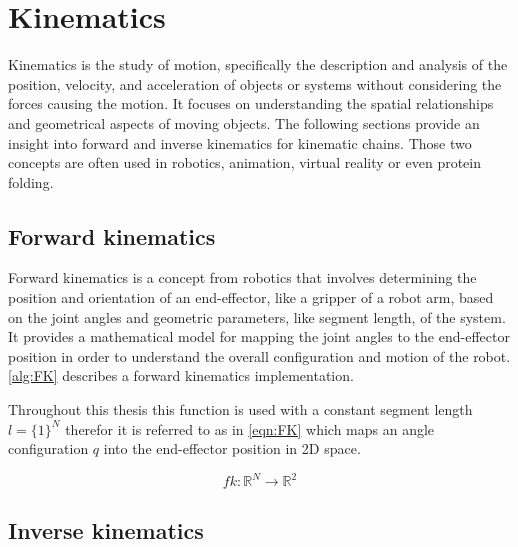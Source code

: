 % 

\section{Kinematics}

Kinematics is the study of motion, specifically the description and analysis of the position, velocity, and acceleration of objects or systems without considering the forces causing the motion. It focuses on understanding the spatial relationships and geometrical aspects of moving objects. The following sections provide an insight into forward and inverse kinematics for kinematic chains. Those two concepts are often used in robotics, animation, virtual reality or even protein folding. 

\subsection{Forward kinematics}

Forward kinematics is a concept from robotics that involves determining the position and orientation of an end-effector, like a gripper of a robot arm, based on the joint angles and geometric parameters, like segment length, of the system. It provides a mathematical model for mapping the joint angles to the end-effector position in order to understand the overall configuration and motion of the robot. \eqref{alg:FK} describes a forward kinematics implementation. 



Throughout this thesis this function is used with a constant segment length $l = \{1\}^N$ therefor it is referred to as in \eqref{eqn:FK} which maps an angle configuration $q$ into the end-effector position in 2D space.

\begin{equation}[p]\label{eqn:FK}
	fk: \mathbb{R}^N \to \mathbb{R}^2
\end{equation}

\subsection{Inverse kinematics}

